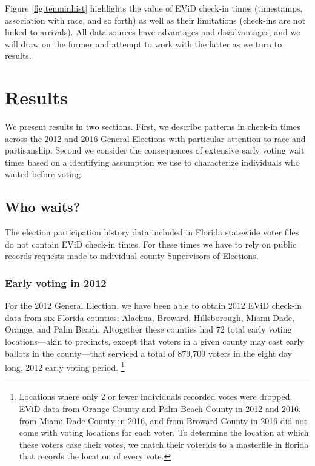 \documentclass[12pt,titlepage]{article}
\begin{document}
Figure \ref{fig:tenminhist} highlights the value of EViD check-in
times (timestamps, association with race, and so forth) as well as
their limitations (check-ins are not linked to arrivals).  All data
sources have advantages and disadvantages, and we will draw on the
former and attempt to work with the latter as we turn to results.

\section*{Results}

We present results in two sections.  First, we describe patterns in
check-in times across the 2012 and 2016 General Elections with
particular attention to race and partisanship.  Second we consider the
consequences of extensive early voting wait times based on a
identifying assumption we use to characterize individuals who waited
before voting.

\subsection*{Who waits?}

The election participation history data included in Florida statewide
voter files do not contain EViD check-in times.  For these times we
have to rely on public records requests made to individual county
Supervisors of Elections.

\subsubsection*{Early voting in 2012}

For the 2012 General Election, we have been able to obtain 2012 EViD
check-in data from six Florida counties: Alachua, Broward,
Hillsborough, Miami Dade, Orange, and Palm Beach.  Altogether these
counties had 72 total early voting locations---akin to precincts,
except that voters in a given county may cast early ballots in the
county---that serviced a total of 879,709 voters in the eight day
long, 2012 early voting
period. \footnote{Locations where only 2 or fewer individuals recorded votes were dropped.
EViD data from Orange County and Palm Beach County in 2012 and 2016, from Miami Dade County in 2016, and from Broward County in 2016 did not come with voting locations for each voter.  To determine the location at which these voters case their votes, we match their voterids to a masterfile in florida that records the location of every vote.}
\end{document}
